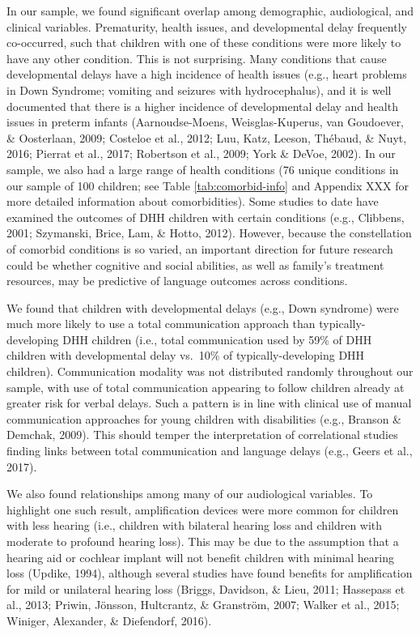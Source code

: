 \documentclass[english,man]{apa6}
\begin{document}
In our sample, we found significant overlap among demographic, audiological, and clinical variables. Prematurity, health issues, and developmental delay frequently co-occurred, such that children with one of these conditions were more likely to have any other condition. This is not surprising. Many conditions that cause developmental delays have a high incidence of health issues (e.g., heart problems in Down Syndrome; vomiting and seizures with hydrocephalus), and it is well documented that there is a higher incidence of developmental delay and health issues in preterm infants (Aarnoudse-Moens, Weisglas-Kuperus, van Goudoever, \& Oosterlaan, 2009; Costeloe et al., 2012; Luu, Katz, Leeson, Thébaud, \& Nuyt, 2016; Pierrat et al., 2017; Robertson et al., 2009; York \& DeVoe, 2002). In our sample, we also had a large range of health conditions (76 unique conditions in our sample of 100 children; see Table \ref{tab:comorbid-info} and Appendix XXX for more detailed information about comorbidities). Some studies to date have examined the outcomes of DHH children with certain conditions (e.g., Clibbens, 2001; Szymanski, Brice, Lam, \& Hotto, 2012). However, because the constellation of comorbid conditions is so varied, an important direction for future research could be whether cognitive and social abilities, as well as family's treatment resources, may be predictive of language outcomes across conditions.

We found that children with developmental delays (e.g., Down syndrome) were much more likely to use a total communication approach than typically-developing DHH children (i.e., total communication used by 59\% of DHH children with developmental delay vs.~10\% of typically-developing DHH children). Communication modality was not distributed randomly throughout our sample, with use of total communication appearing to follow children already at greater risk for verbal delays. Such a pattern is in line with clinical use of manual communication approaches for young children with disabilities (e.g., Branson \& Demchak, 2009). This should temper the interpretation of correlational studies finding links between total communication and language delays (e.g., Geers et al., 2017).

We also found relationships among many of our audiological variables. To highlight one such result, amplification devices were more common for children with less hearing (i.e., children with bilateral hearing loss and children with moderate to profound hearing loss). This may be due to the assumption that a hearing aid or cochlear implant will not benefit children with minimal hearing loss (Updike, 1994), although several studies have found benefits for amplification for mild or unilateral hearing loss (Briggs, Davidson, \& Lieu, 2011; Hassepass et al., 2013; Priwin, Jönsson, Hultcrantz, \& Granström, 2007; Walker et al., 2015; Winiger, Alexander, \& Diefendorf, 2016).
\end{document}
